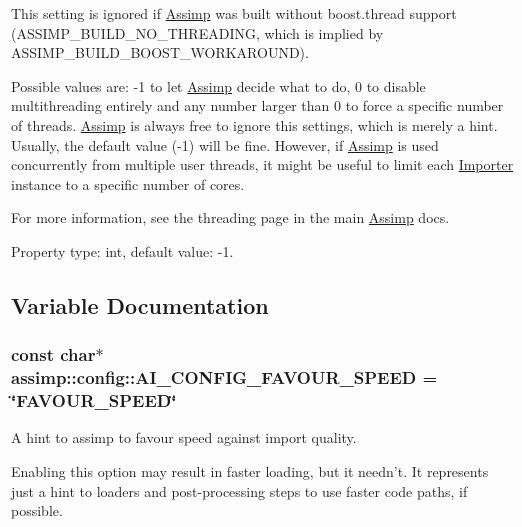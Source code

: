 This setting is ignored if \hyperlink{class_assimp}{Assimp} was built without boost.\+thread support ({\ttfamily A\+S\+S\+I\+M\+P\+\_\+\+B\+U\+I\+L\+D\+\_\+\+N\+O\+\_\+\+T\+H\+R\+E\+A\+D\+I\+N\+G}, which is implied by {\ttfamily A\+S\+S\+I\+M\+P\+\_\+\+B\+U\+I\+L\+D\+\_\+\+B\+O\+O\+S\+T\+\_\+\+W\+O\+R\+K\+A\+R\+O\+U\+N\+D}).

Possible values are\+: -\/1 to let \hyperlink{class_assimp}{Assimp} decide what to do, 0 to disable multithreading entirely and any number larger than 0 to force a specific number of threads. \hyperlink{class_assimp}{Assimp} is always free to ignore this settings, which is merely a hint. Usually, the default value (-\/1) will be fine. However, if \hyperlink{class_assimp}{Assimp} is used concurrently from multiple user threads, it might be useful to limit each \hyperlink{class_importer}{Importer} instance to a specific number of cores.

For more information, see the threading page in the main \hyperlink{class_assimp}{Assimp} docs.

Property type\+: int, default value\+: -\/1.

\subsection{Variable Documentation}
\hypertarget{namespaceassimp_1_1config_a8dd03b04b28e2f4d049e1a0cacc5dd30}{
\subsubsection[{A\+I\+\_\+\+C\+O\+N\+F\+I\+G\+\_\+\+F\+A\+V\+O\+U\+R\+\_\+\+S\+P\+E\+E\+D}]{\setlength{\rightskip}{0pt plus 5cm}const char$\ast$ assimp\+::config\+::\+A\+I\+\_\+\+C\+O\+N\+F\+I\+G\+\_\+\+F\+A\+V\+O\+U\+R\+\_\+\+S\+P\+E\+E\+D = \char`\"{}F\+A\+V\+O\+U\+R\+\_\+\+S\+P\+E\+E\+D\char`\"{}}}\label{namespaceassimp_1_1config_a8dd03b04b28e2f4d049e1a0cacc5dd30}
A hint to assimp to favour speed against import quality.

Enabling this option may result in faster loading, but it needn't. It represents just a hint to loaders and post-\/processing steps to use faster code paths, if possible.

